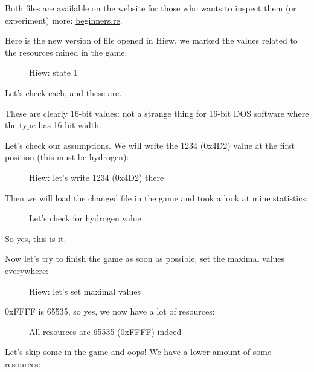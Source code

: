 Both files are available on the website for those who wants to inspect them (or experiment) more: 
\href{http://go.yurichev.com/17212}{beginners.re}.

\clearpage
Here is the new version of file opened in Hiew, we marked the values related to the resources mined in the game: 

\begin{figure}[H]
\centering
{}
\caption{Hiew: state 1}
\label{fig:mill_hiew3}
\end{figure}

Let's check each, and these are.

These are clearly 16-bit values: not a strange thing for 16-bit DOS software where the \Tint type has 16-bit width.

\clearpage
Let's check our assumptions.
We will write the 1234 (0x4D2) value at the first position (this must be hydrogen):

\begin{figure}[H]
\centering
{}
\caption{Hiew: let's write 1234 (0x4D2) there}
\label{fig:mill_hiew4}
\end{figure}

Then we will load the changed file in the game and took a look at mine statistics:

\begin{figure}[H]
\centering
{}
\caption{Let's check for hydrogen value}
\label{fig:mill_5}
\end{figure}

So yes, this is it.

\clearpage
Now let's try to 
finish the game as soon as possible, set the maximal values everywhere:

\begin{figure}[H]
\centering
{}
\caption{Hiew: let's set maximal values}
\label{fig:mill_hiew7}
\end{figure}

0xFFFF is 65535, so yes, we now have a 
lot of resources:

\begin{figure}[H]
\centering
{}
\caption{All resources are 65535 (0xFFFF) indeed}
\label{fig:mill_6}
\end{figure}

\clearpage
Let's skip some  in the game and oops! 
We have a lower amount of some resources:

